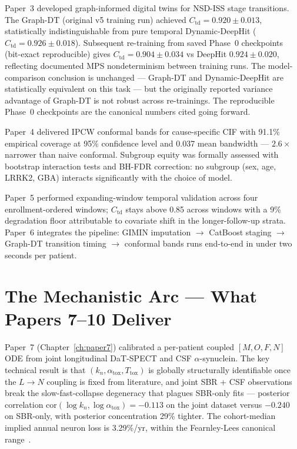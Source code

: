 Paper~3 developed graph-informed digital twins for NSD-ISS stage transitions. The Graph-DT (original v5 training run) achieved $C_\text{td} = 0.920 \pm 0.013$, statistically indistinguishable from pure temporal Dynamic-DeepHit ($C_\text{td} = 0.926 \pm 0.018$). Subsequent re-training from saved Phase~0 checkpoints (bit-exact reproducible) gives $C_\text{td} = 0.904 \pm 0.034$ vs DeepHit $0.924 \pm 0.020$, reflecting documented MPS nondeterminism between training runs. The model-comparison conclusion is unchanged --- Graph-DT and Dynamic-DeepHit are statistically equivalent on this task --- but the originally reported variance advantage of Graph-DT is not robust across re-trainings. The reproducible Phase~0 checkpoints are the canonical numbers cited going forward.

Paper~4 delivered IPCW conformal bands for cause-specific CIF with 91.1\% empirical coverage at 95\% confidence level and 0.037 mean bandwidth --- $2.6\times$ narrower than naive conformal. Subgroup equity was formally assessed with bootstrap interaction tests and BH-FDR correction: no subgroup (sex, age, LRRK2, GBA) interacts significantly with the choice of model.

Paper~5 performed expanding-window temporal validation across four enrollment-ordered windows; $C_\text{td}$ stays above 0.85 across windows with a 9\% degradation floor attributable to covariate shift in the longer-follow-up strata. Paper~6 integrates the pipeline: GIMIN imputation $\to$ CatBoost staging $\to$ Graph-DT transition timing $\to$ conformal bands runs end-to-end in under two seconds per patient.

\section{The Mechanistic Arc --- What Papers 7--10 Deliver}
\label{sec:disc-mechanistic}

Paper~7 (Chapter~\ref{ch:paper7}) calibrated a per-patient coupled $[M, O, F, N]$ ODE from joint longitudinal DaT-SPECT and CSF $\alpha$-synuclein. The key technical result is that $(k_n, \alpha_\text{tox}, T_\text{tox})$ is globally structurally identifiable once the $L \to N$ coupling is fixed from literature, and joint SBR + CSF observations break the slow-fast-collapse degeneracy that plagues SBR-only fits --- posterior correlation $\text{cor}(\log k_n, \log \alpha_\text{tox}) = -0.113$ on the joint dataset versus $-0.240$ on SBR-only, with posterior concentration 29\% tighter. The cohort-median implied annual neuron loss is 3.29\%/yr, within the Fearnley-Lees canonical range~\cite{fearnleyLees1991}.

